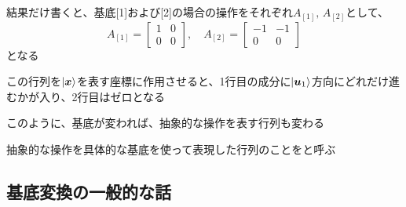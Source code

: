 \documentclass[../book_half_step_linear]{subfiles}
\begin{document}
結果だけ書くと、基底[1]および[2]の場合の操作をそれぞれ$A_{[1]}, \, A_{[2]}$として、
\begin{equation*}
  A_{[1]} = \begin{bmatrix}
    1 & 0 \\
    0 & 0
  \end{bmatrix}, \quad
  A_{[2]} = \begin{bmatrix}
    -1 & -1 \\
    0  & 0
  \end{bmatrix}
\end{equation*}
となる

この行列を$\ket{\vb*{x}}$を表す座標に作用させると、1行目の成分に$\ket{\vb*{u}_1}$方向にどれだけ進むかが入り、2行目はゼロとなる

\br

このように、基底が変われば、抽象的な操作を表す行列も変わる

抽象的な操作を具体的な基底を使って表現した行列のことをと呼ぶ

\sectionline
\subsection{基底変換の一般的な話}
\end{document}
